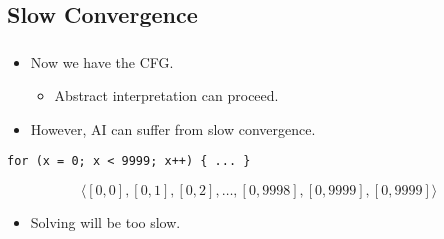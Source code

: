 \documentclass[compress]{beamer}
\begin{document}
\subsection{Slow Convergence}
\begin{frame}[fragile]
	\frametitle{\insertsubsection}

	\begin{itemize}
	\item Now we have the CFG.
		\begin{itemize}
		\item Abstract interpretation can proceed.
		\end{itemize}

	\vfill
	\item However, AI can suffer from slow convergence.
	\end{itemize}

	\vfill

	\begin{center}
	\verb!for (x = 0; x < 9999; x++) { ... }!
	\end{center}

	\vfill
	\[
		\langle [0, 0], [0, 1], [0, 2], \ldots, [0, 9998], [0, 9999], [0, 9999]\rangle
	\]

	\vfill
	\begin{itemize}
	\item Solving will be too slow.
	\end{itemize}

\end{frame}
\end{document}
